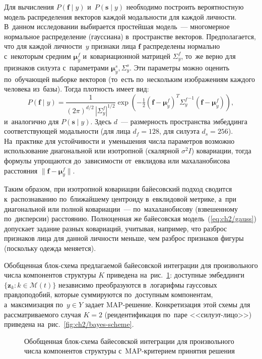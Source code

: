 Для вычисления $P(\mathbf{f}\mid y)$ и~$P(\mathbf{s}\mid y)$ необходимо
построить вероятностную модель распределения векторов каждой
модальности для каждой личности. В~данном исследовании выбирается
простейшая модель~--- многомерное нормальное распределение
(гауссиана) в~пространстве векторов. Предполагается, что для каждой
личности~$y$ признаки лица $\mathbf{f}$ распределены нормально
с~некоторым средним $\boldsymbol{\mu}_y^f$ и~ковариационной матрицей
$\Sigma_y^f$, то~же верно для признаков силуэта с~параметрами
$\boldsymbol{\mu}_y^s,\Sigma_y^s$. Эти параметры можно оценить
по~обучающей выборке векторов (то~есть по~нескольким изображениям
каждого человека из~базы). Тогда плотность имеет вид:
\begin{equation}\label{eq:ch2/gauss}
    P(\mathbf{f}\mid y)=\frac{1}{(2\pi)^{d/2}\,|\Sigma_y^f|^{1/2}}\exp\!\left(-\tfrac{1}{2}(\mathbf{f}-\boldsymbol{\mu}_y^f)^{T}{\Sigma_y^f}^{-1}(\mathbf{f}-\boldsymbol{\mu}_y^f)\right),
\end{equation}
и~аналогично для $P(\mathbf{s}\mid y)$. Здесь $d$~--- размерность
пространства эмбеддинга соответствующей модальности (для лица $d_f=128$, для силуэта $d_s=256$). На~практике для
устойчивости и~уменьшения числа параметров возможно использование
диагональной или изотропной (скалярной $\sigma^2 I$) ковариации,
тогда формулы упрощаются до~зависимости от~евклидова или
махаланобисова расстояния
$\lVert\mathbf{f}-\boldsymbol{\mu}_y^f\rVert$.

Таким образом, при изотропной ковариации байесовский подход сводится
к~распознаванию по~ближайшему центроиду в~евклидовой метрике, а~при
диагональной или полной ковариации~--- по~махаланобисову (взвешенному
по~дисперсии) расстоянию.
Полноценная же байесовская модель~(\ref{eq:ch2/gauss}) допускает
задание разных ковариаций, учитывая, например, что разброс признаков
лица для данной личности меньше, чем разброс признаков фигуры (поскольку одежда меняется).

Обобщенная блок-схема предлагаемой байесовской интеграции для
произвольного числа компонентов структуры $K$ приведена
на~рис.~\ref{fig:ch2/bayes-generic}: доступные эмбеддинги
$\{\mathbf{z}_k\colon k\in\mathcal{M}(t)\}$ независимо преобразуются
в~логарифмы гауссовых правдоподобий, которые суммируются по~доступным
компонентам, а~максимизация по~$y\in Y$ задает MAP-решение.
Конкретизация этой схемы для рассматриваемого случая $K=2$
(реидентификация по~паре <<силуэт-лицо>>) приведена
на~рис.~\ref{fig:ch2/bayes-scheme}.

\begin{figure}[htbp]
\centering

\caption{Обобщенная блок-схема байесовской интеграции для произвольного
числа компонентов структуры с~MAP-критерием принятия решения}
\label{fig:ch2/bayes-generic}
\end{figure}

